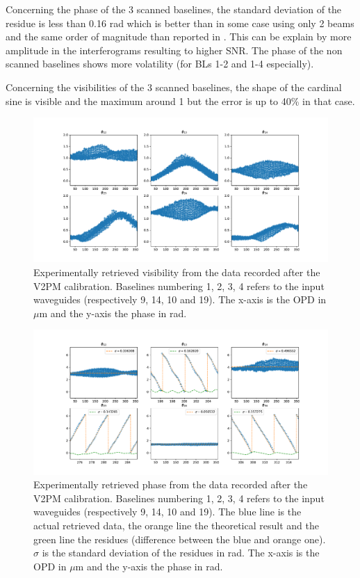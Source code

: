 Concerning the phase of the 3 scanned baselines, the standard deviation of the residue is less than 0.16 rad which is better than in some case using only 2 beams and the same order of magnitude than reported in \cite{Diener2017}. This can be explain by more amplitude in the interferograms  resulting to higher SNR. The phase of the non scanned baselines shows more volatility (for BLs 1-2 and 1-4 especially). 

Concerning the visibilities of the 3 scanned baselines, the shape of the cardinal sine is visible and the maximum around 1 but the error is up to 40\% in that case.

\begin{figure}[htbp!]
 \centering
 \includegraphics[scale=.4]{../picture/retrieve_visi_4BL2.pdf}
 \caption{Experimentally retrieved visibility from the data recorded after the V2PM calibration. Baselines numbering 1, 2, 3, 4 refers to the input waveguides (respectively  9, 14, 10 and 19). The x-axis is the OPD in $\mu$m and the y-axis the phase in rad. }
 \label{fig:retrieved_visi_4BL2}
\end{figure}

\begin{figure}[htbp!]
 \centering
 \includegraphics[scale=.4]{../picture/retrieve_phase_4BL2.pdf}
 \caption{Experimentally retrieved phase from the data recorded after the V2PM calibration. Baselines numbering 1, 2, 3, 4 refers to the input waveguides (respectively  9, 14, 10 and 19). The blue line is the actual retrieved data, the orange line the theoretical result and the green line the residues (difference between the blue and orange one). $\sigma$ is the standard deviation of the residues in rad. The x-axis is the OPD in $\mu$m and the y-axis the phase in rad. }
 \label{fig:retrieved_phase_4BL2}
\end{figure}

